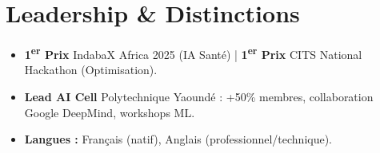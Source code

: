 \documentclass[a4paper,11pt]{article}
\begin{document}
\section{Leadership \& Distinctions}
\begin{itemize}[leftmargin=*, label=\tiny$\bullet$, nosep]
    \item \small{\textbf{1\textsuperscript{er} Prix} IndabaX Africa 2025 (IA Santé) | \textbf{1\textsuperscript{er} Prix} CITS National Hackathon (Optimisation).}
    \item \small{\textbf{Lead AI Cell} Polytechnique Yaoundé : +50\% membres, collaboration Google DeepMind, workshops ML.}
    \item \small{\textbf{Langues :} Français (natif), Anglais (professionnel/technique).}
\end{itemize}
\end{document}
